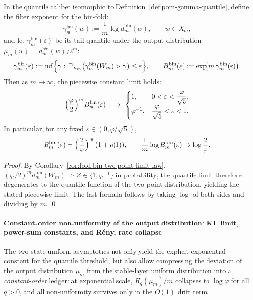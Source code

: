 \begin{corollary}\label{cor:fold-bin-quantile-threshold-constant}
In the quantile caliber isomorphic to Definition~\ref{def:pom-gamma-quantile}, define the fiber exponent for the bin-fold:
\[
\gamma^{\mathrm{bin}}_m(w):=\frac{1}{m}\log d^{\mathrm{bin}}_m(w),\qquad w\in X_m,
\]
and let \(\gamma^{\mathrm{bin}}_m(\varepsilon)\) be its tail quantile under the output distribution \(\mu_m(w)=d^{\mathrm{bin}}_m(w)/2^m\):
\[
\gamma^{\mathrm{bin}}_{m}(\varepsilon):=\inf\Bigl\{\gamma:\ \mathbb{P}_{\mu_m}\bigl(\gamma^{\mathrm{bin}}_m(W_m)>\gamma\bigr)\le \varepsilon\Bigr\},
\qquad
B^{\mathrm{bin}}_m(\varepsilon):=\exp\!\bigl(m\,\gamma^{\mathrm{bin}}_m(\varepsilon)\bigr).
\]
Then as \(m\to\infty\), the piecewise constant limit holds:
\[
\Bigl(\frac{\varphi}{2}\Bigr)^m B^{\mathrm{bin}}_m(\varepsilon)\ \longrightarrow\
\begin{cases}
1,& 0<\varepsilon<\displaystyle\frac{\varphi}{\sqrt5},\\[6pt]
\varphi^{-1},& \displaystyle\frac{\varphi}{\sqrt5}<\varepsilon<1.
\end{cases}
\]
In particular, for any fixed \(\varepsilon\in(0,\varphi/\sqrt5)\),
\[
B^{\mathrm{bin}}_m(\varepsilon)
=\Bigl(\frac{2}{\varphi}\Bigr)^m\,(1+o(1)),
\qquad
\frac{1}{m}\log B^{\mathrm{bin}}_m(\varepsilon)\to \log\frac{2}{\varphi}.
\]
\end{corollary}

\begin{proof}
By Corollary~\ref{cor:fold-bin-two-point-limit-law},
\(
(\varphi/2)^m d^{\mathrm{bin}}_m(W_m)\Rightarrow Z\in\{1,\varphi^{-1}\}
\) in probability;
the quantile limit therefore degenerates to the quantile function of the two-point distribution, yielding the stated piecewise limit.
The last formula follows by taking \(\log\) of both sides and dividing by \(m\). \qed
\end{proof}

\paragraph{Constant-order non-uniformity of the output distribution: KL limit, power-sum constants, and R\'enyi rate collapse}
The two-state uniform asymptotics not only yield the explicit exponential constant for the quantile threshold, but also allow compressing the deviation of the output distribution \(\mu_m\) from the stable-layer uniform distribution into a \emph{constant-order} ledger:
at exponential scale, \(H_q(\mu_m)/m\) collapses to \(\log\varphi\) for all \(q>0\), and all non-uniformity survives only in the \(O(1)\) drift term.

